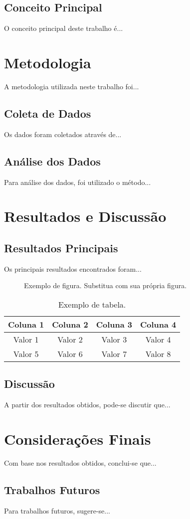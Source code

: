 \documentclass{ufpe-article}
\begin{document}
\subsection{Conceito Principal}
O conceito principal deste trabalho é...

\section{Metodologia}
A metodologia utilizada neste trabalho foi...

\subsection{Coleta de Dados}
Os dados foram coletados através de...

\subsection{Análise dos Dados}
Para análise dos dados, foi utilizado o método...

\section{Resultados e Discussão}
\subsection{Resultados Principais}
Os principais resultados encontrados foram...

\begin{figure}[htb]
	\centering
	\caption{Exemplo de figura. Substitua com sua própria figura.}
	\label{fig:exemplo}
\end{figure}

\begin{table}[htb]
	\centering
	\caption{Exemplo de tabela.}
	\label{tab:exemplo}
	\begin{tabular}{cccc}
		\toprule
		\textbf{Coluna 1} & \textbf{Coluna 2} & \textbf{Coluna 3} & \textbf{Coluna 4} \\
		\midrule
		Valor 1           & Valor 2           & Valor 3           & Valor 4           \\
		Valor 5           & Valor 6           & Valor 7           & Valor 8           \\
		\bottomrule
	\end{tabular}
\end{table}

\subsection{Discussão}
A partir dos resultados obtidos, pode-se discutir que...

\section{Considerações Finais}
Com base nos resultados obtidos, conclui-se que...

\subsection{Trabalhos Futuros}
Para trabalhos futuros, sugere-se...

\end{document}
